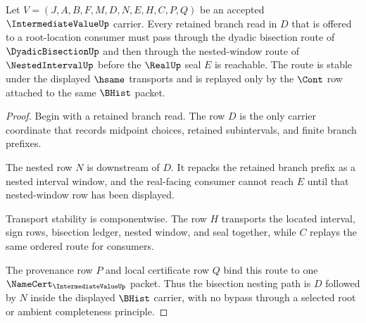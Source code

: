 \begin{theorem}
\label{thm:intermediate-value-bisection-nesting}
Let $V=(J,A,B,F,M,D,N,E,H,C,P,Q)$ be an accepted $\IntermediateValueUp$ carrier. Every retained branch read in $D$ that is offered to a root-location consumer must pass through the dyadic bisection route of $\DyadicBisectionUp$ and then through the nested-window route of $\NestedIntervalUp$ before the $\RealUp$ seal $E$ is reachable. The route is stable under the displayed $\hsame$ transports and is replayed only by the $\Cont$ row attached to the same $\BHist$ packet.
\end{theorem}
\begin{proof}
Begin with a retained branch read. The row $D$ is the only carrier coordinate that records midpoint choices, retained subintervals, and finite branch prefixes.

The nested row $N$ is downstream of $D$. It repacks the retained branch prefix as a nested interval window, and the real-facing consumer cannot reach $E$ until that nested-window row has been displayed.

Transport stability is componentwise. The row $H$ transports the located interval, sign rows, bisection ledger, nested window, and seal together, while $C$ replays the same ordered route for consumers.

The provenance row $P$ and local certificate row $Q$ bind this route to one $\NameCert_{\IntermediateValueUp}$ packet. Thus the bisection nesting path is $D$ followed by $N$ inside the displayed $\BHist$ carrier, with no bypass through a selected root or ambient completeness principle.
\end{proof}

